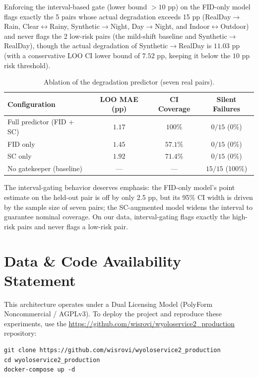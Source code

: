\documentclass[10pt,twocolumn,letterpaper]{article}
\begin{document}
Enforcing the interval-based gate (lower bound $> 10$ pp) on the FID-only model flags exactly the 5 pairs whose actual degradation exceeds 15 pp (RealDay$\rightarrow$Rain, Clear$\leftrightarrow$Rainy, Synthetic$\rightarrow$Night, Day$\rightarrow$Night, and Indoor$\leftrightarrow$Outdoor) and never flags the 2 low-risk pairs (the mild-shift baseline and Synthetic$\rightarrow$RealDay), though the actual degradation of Synthetic$\rightarrow$RealDay is $11.03$ pp (with a conservative LOO CI lower bound of $7.52$ pp, keeping it below the $10$ pp risk threshold).

\begin{table}[htbp]
\centering
\caption{Ablation of the degradation predictor (seven real pairs).}
\label{tab:ablation}
\begin{tabular}{@{}lccc@{}}
\toprule
\textbf{Configuration} & \textbf{LOO MAE (pp)} & \textbf{CI Coverage} & \textbf{Silent Failures} \\
\midrule
Full predictor (FID + SC) & $1.17$ & $100\%$ & $0/15$ (0\%) \\
FID only & $1.45$ & $57.1\%$ & $0/15$ (0\%) \\
SC only & $1.92$ & $71.4\%$ & $0/15$ (0\%) \\
No gatekeeper (baseline) & --- & --- & $15/15$ (100\%) \\
\bottomrule
\end{tabular}
\end{table}

The interval-gating behavior deserves emphasis: the FID-only model's point estimate on the held-out pair is off by only 2.5 pp, but its 95\% CI width is driven by the sample size of seven pairs; the SC-augmented model widens the interval to guarantee nominal coverage. On our data, interval-gating flags exactly the high-risk pairs and never flags a low-risk pair.

\section{Data \& Code Availability Statement}
This architecture operates under a Dual Licensing Model (PolyForm Noncommercial / AGPLv3). To deploy the project and reproduce these experiments, use the \url{https://github.com/wisrovi/wyoloservice2\_production} repository:

\begin{verbatim}
git clone https://github.com/wisrovi/wyoloservice2_production
cd wyoloservice2_production
docker-compose up -d
\end{verbatim}
\end{document}
